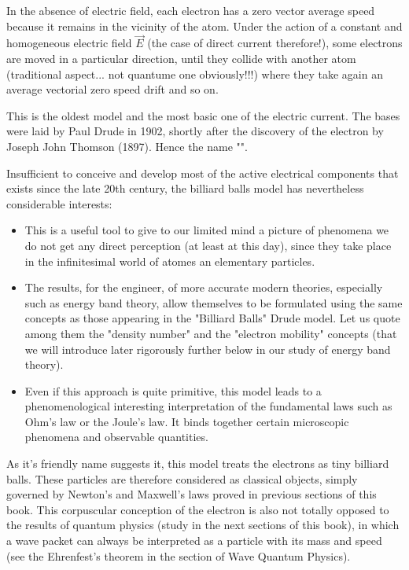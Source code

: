 	In the absence of electric field, each electron has a zero vector average speed because it remains in the vicinity of the atom. Under the action of a constant and homogeneous electric field $\vec{E}$ (the case of direct current therefore!), some electrons are moved in a particular direction, until they collide with another atom (traditional aspect... not quantume one obviously!!!) where they take again an average vectorial zero speed drift and so on.
	
	This is the oldest model and the most basic one of the electric current. The bases were laid by Paul Drude in 1902, shortly after the discovery of the electron by Joseph John Thomson (1897). Hence the name "".
	
	Insufficient to conceive and develop most of the active electrical components that exists since the late 20th century, the billiard balls model has nevertheless considerable interests:
	
	\begin{itemize}
		\item This is a useful tool to give to our limited mind a picture of phenomena we do not get any direct perception (at least at this day), since they take place in the infinitesimal world of atomes an elementary particles.

		\item The results, for the engineer, of more accurate modern theories, especially such as energy band theory, allow themselves to be formulated using the same concepts as those appearing in the "Billiard Balls" Drude model. Let us quote among them the "density number" and the "electron mobility" concepts (that we will introduce later rigorously further below in our study of energy band theory).

		\item Even if this approach is quite primitive, this model leads to a phenomenological interesting interpretation of the fundamental laws such as Ohm's law or the Joule's law. It binds together certain microscopic phenomena and observable quantities.
	\end{itemize}
	As it's friendly name suggests it, this model treats the electrons as tiny billiard balls. These particles are therefore considered as classical objects, simply governed by Newton's and Maxwell's laws proved in previous sections of this book. This corpuscular conception of the electron is also not totally opposed to the results of quantum physics (study in the next sections of this book), in which a wave packet can always be interpreted as a particle with its mass and speed (see the Ehrenfest's theorem in the section of Wave Quantum Physics).
	
